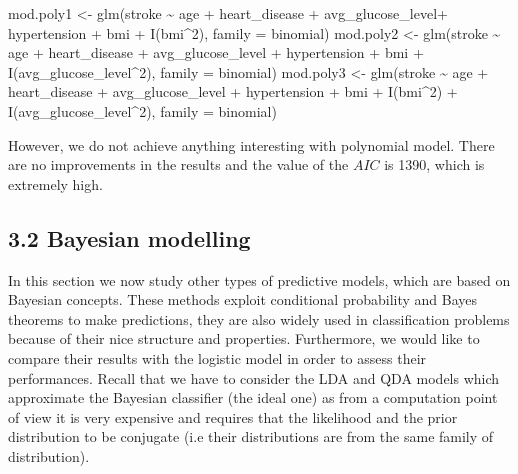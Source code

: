 \documentclass[
]{article}
\newenvironment{Shaded}{\begin{snugshade}}{\end{snugshade}}
\newcommand{\AttributeTok}[1]{\textcolor[rgb]{0.77,0.63,0.00}{#1}}
\newcommand{\DecValTok}[1]{\textcolor[rgb]{0.00,0.00,0.81}{#1}}
\newcommand{\FunctionTok}[1]{\textcolor[rgb]{0.00,0.00,0.00}{#1}}
\newcommand{\NormalTok}[1]{#1}
\newcommand{\OtherTok}[1]{\textcolor[rgb]{0.56,0.35,0.01}{#1}}
\newcommand{\SpecialCharTok}[1]{\textcolor[rgb]{0.00,0.00,0.00}{#1}}
\begin{document}
\begin{Shaded}
\begin{Highlighting}[]
\NormalTok{mod.poly1 }\OtherTok{\textless{}{-}} \FunctionTok{glm}\NormalTok{(stroke }\SpecialCharTok{\textasciitilde{}}\NormalTok{ age }\SpecialCharTok{+}\NormalTok{ heart\_disease }\SpecialCharTok{+}\NormalTok{ avg\_glucose\_level}\SpecialCharTok{+}\NormalTok{ hypertension}
                 \SpecialCharTok{+}\NormalTok{ bmi }\SpecialCharTok{+} \FunctionTok{I}\NormalTok{(bmi}\SpecialCharTok{\^{}}\DecValTok{2}\NormalTok{), }\AttributeTok{family =}\NormalTok{ binomial)}
\NormalTok{mod.poly2 }\OtherTok{\textless{}{-}} \FunctionTok{glm}\NormalTok{(stroke }\SpecialCharTok{\textasciitilde{}}\NormalTok{ age }\SpecialCharTok{+}\NormalTok{ heart\_disease }\SpecialCharTok{+}\NormalTok{ avg\_glucose\_level }\SpecialCharTok{+}\NormalTok{ hypertension }
                 \SpecialCharTok{+}\NormalTok{ bmi }\SpecialCharTok{+} \FunctionTok{I}\NormalTok{(avg\_glucose\_level}\SpecialCharTok{\^{}}\DecValTok{2}\NormalTok{), }\AttributeTok{family =}\NormalTok{ binomial)}
\NormalTok{mod.poly3 }\OtherTok{\textless{}{-}} \FunctionTok{glm}\NormalTok{(stroke }\SpecialCharTok{\textasciitilde{}}\NormalTok{ age }\SpecialCharTok{+}\NormalTok{ heart\_disease }\SpecialCharTok{+}\NormalTok{ avg\_glucose\_level }\SpecialCharTok{+}\NormalTok{ hypertension }
                 \SpecialCharTok{+}\NormalTok{ bmi }\SpecialCharTok{+} \FunctionTok{I}\NormalTok{(bmi}\SpecialCharTok{\^{}}\DecValTok{2}\NormalTok{) }\SpecialCharTok{+} \FunctionTok{I}\NormalTok{(avg\_glucose\_level}\SpecialCharTok{\^{}}\DecValTok{2}\NormalTok{), }\AttributeTok{family =}\NormalTok{ binomial)}
\end{Highlighting}
\end{Shaded}

However, we do not achieve anything interesting with polynomial model.
There are no improvements in the results and the value of the \(AIC\) is
1390, which is extremely high.

\hypertarget{bayesian-modelling}{%
\subsection{3.2 Bayesian modelling}\label{bayesian-modelling}}

In this section we now study other types of predictive models, which are
based on Bayesian concepts. These methods exploit conditional
probability and Bayes theorems to make predictions, they are also widely
used in classification problems because of their nice structure and
properties. Furthermore, we would like to compare their results with the
logistic model in order to assess their performances. Recall that we
have to consider the LDA and QDA models which approximate the Bayesian
classifier (the ideal one) as from a computation point of view it is
very expensive and requires that the likelihood and the prior
distribution to be conjugate (i.e their distributions are from the same
family of distribution).
\end{document}
